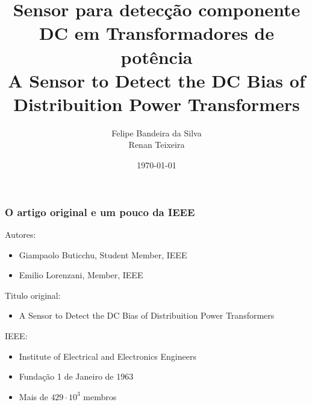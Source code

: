 \documentclass{beamer}
\title[Sensor para detecção componente DC]{Sensor para detecção componente DC em Transformadores de potência\\\small{A Sensor to Detect the DC Bias of Distribuition Power Transformers}} %
\author{Felipe Bandeira da Silva\\Renan Teixeira} %
\institute[Unifor] %
{
Universidade de Fortaleza-UNIFOR\\%
\medskip
}
\date{\today} %
\begin{document}
\begin{frame}
\titlepage %
\end{frame}



\begin{frame}
    \frametitle{O artigo original e um pouco da IEEE}

    Autores:
    \begin{itemize}
        \item Giampaolo Buticchu, Student Member, IEEE
        \item Emilio Lorenzani, Member, IEEE
    \end{itemize}
    Titulo original:
    \begin{itemize}
        \item A Sensor to Detect the DC Bias of Distribuition Power Transformers
    \end{itemize}

    IEEE:
    \begin{itemize}
        \item Institute of Electrical and Electronics Engineers
        \item Fundação 1 de Janeiro de 1963
        \item Mais de $429 \cdot 10^3 $ membros
    \end{itemize}
\end{frame}
\end{document}
